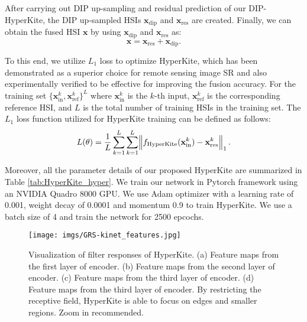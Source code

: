 \documentclass[journal]{IEEEtran}
\begin{document}
    \par After carrying out DIP up-sampling and residual prediction of our DIP-HyperKite, the DIP up-sampled HSIs $\mathbf{x}_{\text{dip}}$ and $\mathbf{x}_{\text{res}}$ are created. Finally, we can obtain the fused HSI $\mathbf{x}$ by using  $\mathbf{x}_{\text{dip}}$ and $\mathbf{x}_{\text{res}}$ as:
    \begin{equation}
        \mathbf{x} = \mathbf{x}_{\text{res}} + \mathbf{x}_{\text{dip}}. 
    \end{equation}
    
    \par To this end, we utilize $L_1$ loss to optimize HyperKite, which has been demonstrated as a superior choice for remote sensing image SR \cite{Hyper-PNN, hyperspectral_pan_review} and also experimentally verified to be effective for improving the fusion accuracy. For the training set $\{\mathbf{x}_{\text{in}}^k, \mathbf{x}_{\text{ref}}^k\}^L$  where $\mathbf{x}_{\text{in}}^k$ is the $k$-th input, $\mathbf{x}_{\text{ref}}^k$ is the corresponding reference HSI, and $L$ is the total number of training HSIs in the training set. The $L_1$ loss function utilized for HyperKite training can be defined as follows:
    \begin{equation}
        L(\theta) = \frac{1}{L} \sum_{k=1}^{L} \sum_{k=1}^{L} \norm{f_{\text{HyperKite}}(\mathbf{x}_{\text{in}}^k) - \mathbf{x}_{\text{res}}^k}_1.
    \end{equation}
    
Moreover, all the parameter details of our proposed HyperKite are  summarized in Table \ref{tab:HyperKite_hyper}. We train our network in Pytorch framework using an NVIDIA Quadro 8000 GPU. We use Adam optimizer with a learning rate of 0.001, weight decay of 0.0001 and momentum 0.9 to train HyperKite. We use a batch size of 4 and train the network for 2500 epcochs.

    \begin{figure}[tb]
        \centering
        \texttt{[image: imgs/GRS-kinet\_features.jpg]}
        \caption{Visualization of filter responses of HyperKite. (a) Feature maps from the first layer of encoder. (b) Feature maps from the second layer of encoder. (c) Feature maps from the third layer of encoder. (d) Feature maps from the third layer of encoder. By restricting the receptive field, HyperKite is able to focus on edges and smaller regions. Zoom in recommended.}
        \label{fig:HyperKite_feature_maps}
    \end{figure}
\end{document}
